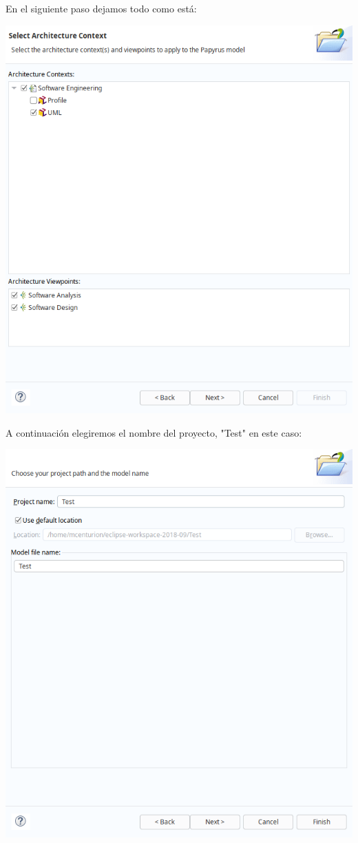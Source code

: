 \documentclass[11pt]{article}
\begin{document}
En el siguiente paso dejamos todo como está:

\begin{center}
\includegraphics[width=.9\linewidth]{images/proyecto_3.png}
\end{center}

A continuación elegiremos el nombre del proyecto, "Test" en este caso:

\begin{center}
\includegraphics[width=.9\linewidth]{images/proyecto_4.png}
\end{center}
\end{document}
